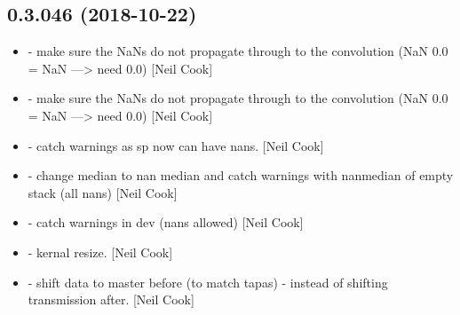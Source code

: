\documentclass[a4paper,10pt,english]{report}
\begin{document}
\subsection{0.3.046 (2018-10-22)}
\label{\detokenize{misc/changelog:id286}}\begin{itemize}
\item {} 
 - make sure the NaNs do not propagate through to the
convolution (NaN \sphinxtitleref{*} 0.0 = NaN —\textgreater{} need 0.0) {[}Neil Cook{]}

\item {} 
 - make sure the NaNs do not propagate through to the
convolution (NaN \sphinxtitleref{*} 0.0 = NaN —\textgreater{} need 0.0) {[}Neil Cook{]}

\item {} 
 - catch warnings as sp now can have nans. {[}Neil Cook{]}

\item {} 
 - change median to nan median and catch
warnings with nanmedian of empty stack (all nans) {[}Neil Cook{]}

\item {} 
 - catch warnings in dev (nans allowed) {[}Neil Cook{]}

\item {} 
 - kernal resize. {[}Neil Cook{]}

\item {} 
 - shift data to master before (to match tapas) -
instead of shifting transmission after. {[}Neil Cook{]}

\end{itemize}
\end{document}
